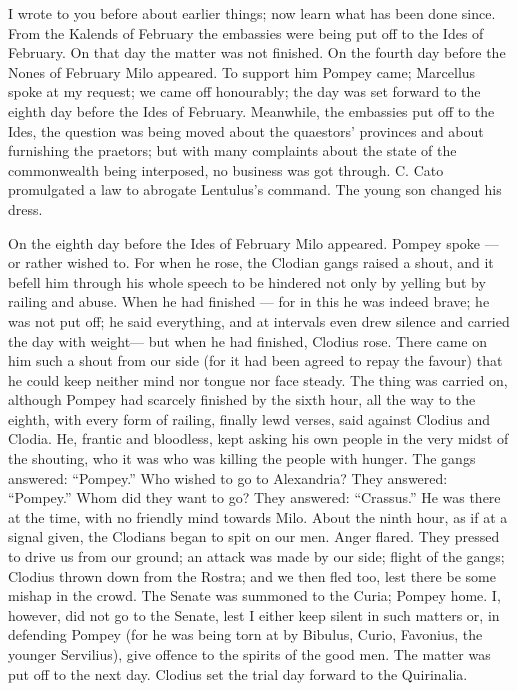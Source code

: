 

 I wrote to you before about earlier things; now learn what has been done since. From the Kalends of February the embassies were being put off to the Ides of February. On that day the matter was not finished. On the fourth day before the Nones of February Milo appeared. To support him Pompey came; Marcellus spoke at my request; we came off honourably; the day was set forward to the eighth day before the Ides of February. Meanwhile, the embassies put off to the Ides, the question was being moved about the quaestors' provinces and about furnishing the praetors; but with many complaints about the state of the commonwealth being interposed, no business was got through. C. Cato promulgated a law to abrogate Lentulus's command. The young son changed his dress.

 On the eighth day before the Ides of February Milo appeared. Pompey spoke --- or rather wished to. For when he rose, the Clodian gangs raised a shout, and it befell him through his whole speech to be hindered not only by yelling but by railing and abuse. When he had finished --- for in this he was indeed brave; he was not put off; he said everything, and at intervals even drew silence and \dag carried the day with weight\dag --- but when he had finished, Clodius rose. There came on him such a shout from our side (for it had been agreed to repay the favour) that he could keep neither mind nor tongue nor face steady. The thing was carried on, although Pompey had scarcely finished by the sixth hour, all the way to the eighth, with every form of railing, finally lewd verses, said against Clodius and Clodia. He, frantic and bloodless, kept asking his own people in the very midst of the shouting, who it was who was killing the people with hunger. The gangs answered: ``Pompey.'' Who wished to go to Alexandria? They answered: ``Pompey.'' Whom did they want to go? They answered: ``Crassus.'' He was there at the time, with no friendly mind towards Milo. About the ninth hour, as if at a signal given, the Clodians began to spit on our men. Anger flared. They pressed to drive us from our ground; an attack was made by our side; flight of the gangs; Clodius thrown down from the Rostra; and we then fled too, lest there be some mishap in the crowd. The Senate was summoned to the Curia; Pompey home. I, however, did not go to the Senate, lest I either keep silent in such matters or, in defending Pompey (for he was being torn at by Bibulus, Curio, Favonius, the younger Servilius), give offence to the spirits of the good men. The matter was put off to the next day. Clodius set the trial day forward to the Quirinalia.

